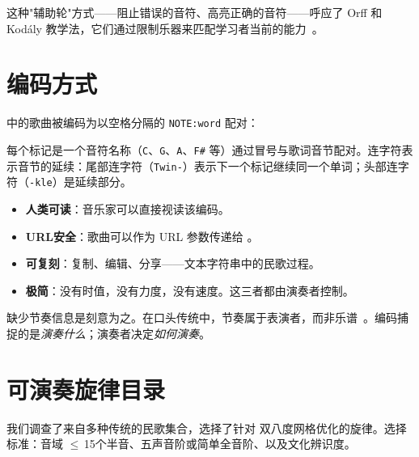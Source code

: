 \documentclass[11pt]{article}
\begin{document}
这种"辅助轮"方式——阻止错误的音符、高亮正确的音符——呼应了 Orff 和 Kod\'aly 教学法，它们通过限制乐器来匹配学习者当前的能力~\citep{kodaly1971folk, orff1978schulwerk}。

\section{编码方式}

\np{} 中的歌曲被编码为以空格分隔的 \texttt{NOTE:word} 配对：


每个标记是一个音符名称（\texttt{C}、\texttt{G}、\texttt{A}、\texttt{F\#} 等）通过冒号与歌词音节配对。连字符表示音节的延续：尾部连字符（\texttt{Twin-}）表示下一个标记继续同一个单词；头部连字符（\texttt{-kle}）是延续部分。

\begin{card}
\begin{itemize}
  \item \textbf{人类可读}：音乐家可以直接视读该编码。
  \item \textbf{URL安全}：歌曲可以作为 URL 参数传递给 \np{}。
  \item \textbf{可复刻}：复制、编辑、分享——文本字符串中的民歌过程。
  \item \textbf{极简}：没有时值，没有力度，没有速度。这三者都由演奏者控制。
\end{itemize}
\end{card}

缺少节奏信息是刻意为之。在口头传统中，节奏属于表演者，而非乐谱~\citep{lomax1968folk}。编码捕捉的是\emph{演奏什么}；演奏者决定\emph{如何演奏}。

\section{可演奏旋律目录}

我们调查了来自多种传统的民歌集合，选择了针对 \np{} 双八度网格优化的旋律。选择标准：音域 $\leq$\,15个半音、五声音阶或简单全音阶、以及文化辨识度。
\end{document}
